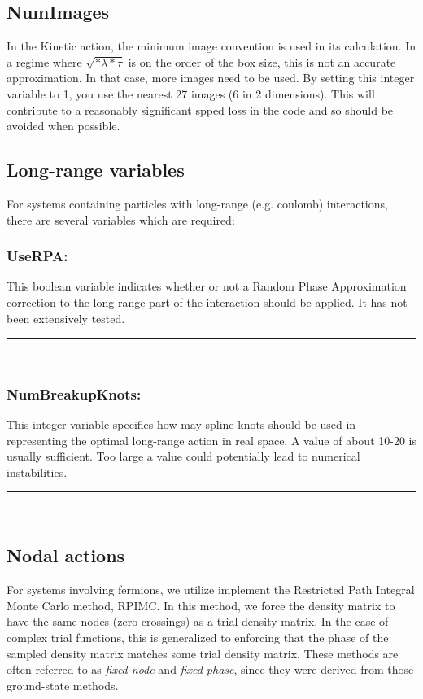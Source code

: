\documentclass{book}
\begin{document}
\subsection{NumImages}
In the Kinetic action, the minimum image convention is used in its
calculation. In a regime where $\sqrt{*\lambda*\tau}$ is on the order
of the box size, this is not an accurate approximation. In that case,
more images need to be used. By setting this integer variable to 1,
you use the nearest 27 images (6 in 2 dimensions).  This will
contribute to a reasonably significant spped loss in the code and so
should be avoided when possible.
\subsection{Long-range variables}
For systems containing particles with long-range (e.g. coulomb)
interactions, there are several variables which are required:
\subsubsection{UseRPA:}
   This boolean variable indicates whether or not a Random Phase
 Approximation correction to the long-range part of the interaction
 should be applied.  It has not been extensively tested.\\
\rule{0.6cm}{0cm}\\
\subsubsection{NumBreakupKnots:}
This integer variable specifies how may spline knots should be used in
representing the optimal long-range action in real space.  A value of
about 10-20 is usually sufficient.  Too large a value could
potentially lead to numerical instabilities.\\
\rule{0.0cm}{0.75cm}\rule{0.6cm}{0cm}\\



\subsection{Nodal actions}
For systems involving fermions, we utilize implement the Restricted
Path Integral Monte Carlo method, RPIMC.  In this method, we force the
density matrix to have the same nodes (zero crossings) as a trial
density matrix.  In the case of complex trial functions, this is
generalized to enforcing that the phase of the sampled density matrix
matches some trial density matrix.  These methods are often referred
to as {\em fixed-node} and {\em fixed-phase}, since they were derived
from those ground-state methods.  
\end{document}

